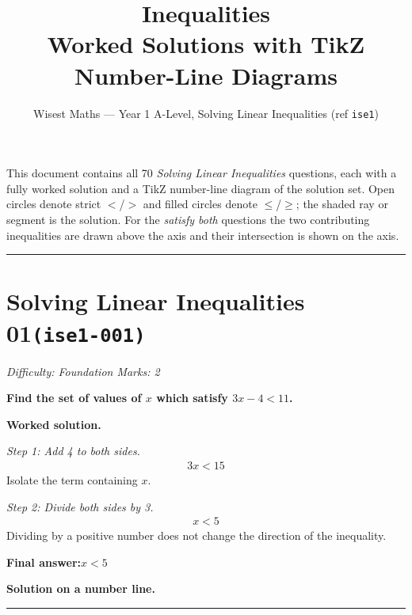\documentclass[11pt]{article}
\title{\textbf{Inequalities}\\[0.3em]\large Worked Solutions with TikZ Number-Line Diagrams}
\author{Wisest Maths --- Year 1 A-Level, Solving Linear Inequalities (ref \texttt{ise1})}
\date{}
\newcommand{\question}[1]{\par\medskip\noindent\textbf{#1}\par}
\begin{document}
\maketitle
\noindent This document contains all 70 \emph{Solving Linear Inequalities} questions, each with a
fully worked solution and a TikZ number-line diagram of the solution set. Open circles denote strict
\(<\)/\(>\) and filled circles denote \(\le\)/\(\ge\); the shaded ray or segment is the solution. For the
\emph{satisfy both} questions the two contributing inequalities are drawn above the axis and their intersection
is shown on the axis.
\tableofcontents
\bigskip
\hrule

\section*{Solving Linear Inequalities 01\quad\small\texttt{(ise1-001)}}
\textit{Difficulty: Foundation \quad\textbar\quad Marks: 2}

\question{Find the set of values of \( x \) which satisfy \( 3x - 4 < 11 \).}

\textbf{Worked solution.}

\textit{Step 1: Add 4 to both sides.}
\[\begin{gathered}
3x < 15
\end{gathered}\]
Isolate the term containing \( x \).

\textit{Step 2: Divide both sides by 3.}
\[\begin{gathered}
x < 5
\end{gathered}\]
Dividing by a positive number does not change the direction of the inequality.

\begin{answerbox}
\textbf{Final answer:}\quad \(\displaystyle  x < 5 \)
\end{answerbox}
\textbf{Solution on a number line.}

\begin{center}
\end{center}
\medskip\hrule
\end{document}
